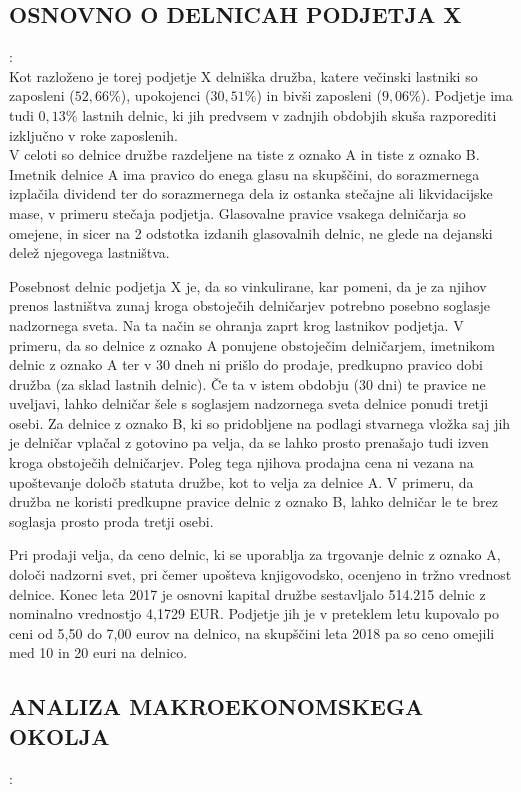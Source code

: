 \documentclass[12pt,a4paper]{amsart}
\theoremstyle{definition} %
\theoremstyle{plain} %
\begin{document}
\subsection{OSNOVNO O DELNICAH PODJETJA X}:\\

Kot razloženo je torej podjetje X delniška družba, katere večinski lastniki so zaposleni ($52,66\%$), upokojenci ($30,51\%$) in bivši zaposleni ($9,06\%$). Podjetje ima tudi $0,13\%$ lastnih delnic, ki jih predvsem v zadnjih obdobjih skuša razporediti izključno v roke zaposlenih.\\
V celoti so delnice družbe razdeljene na tiste z oznako A in tiste z oznako B. Imetnik delnice A ima pravico do enega glasu na skupščini, do sorazmernega izplačila dividend ter do sorazmernega dela iz ostanka stečajne ali likvidacijske mase, v primeru stečaja podjetja. Glasovalne pravice vsakega delničarja so omejene, in sicer na 2 odstotka izdanih glasovalnih delnic, ne glede na dejanski delež njegovega lastništva.\par
Posebnost delnic podjetja X je, da so vinkulirane, kar pomeni, da je za njihov prenos lastništva zunaj kroga obstoječih delničarjev potrebno posebno soglasje nadzornega sveta. Na ta način se ohranja zaprt krog lastnikov podjetja. V primeru, da so delnice z oznako A ponujene obstoječim delničarjem, imetnikom delnic z oznako A ter v 30 dneh ni prišlo do prodaje, predkupno pravico dobi družba (za sklad lastnih delnic). Če ta v istem obdobju (30 dni) te pravice ne uveljavi, lahko delničar šele s soglasjem nadzornega sveta delnice ponudi tretji osebi.
Za delnice z oznako B, ki so pridobljene na podlagi stvarnega vložka saj jih je delničar vplačal z gotovino pa velja, da se lahko prosto prenašajo tudi izven kroga obstoječih delničarjev. Poleg tega njihova prodajna cena ni vezana na upoštevanje določb statuta družbe, kot to velja za delnice A. V primeru, da družba ne koristi predkupne pravice delnic z oznako B, lahko delničar le te brez soglasja prosto proda tretji osebi.\par
Pri prodaji velja, da ceno delnic, ki se uporablja za trgovanje delnic z oznako A, določi nadzorni svet, pri čemer upošteva knjigovodsko, ocenjeno in tržno vrednost delnice. Konec leta 2017 je osnovni kapital družbe sestavljalo 514.215 delnic z nominalno vrednostjo 4,1729 EUR. Podjetje jih je v preteklem letu kupovalo po ceni od 5,50 do 7,00 eurov na delnico, na skupščini leta 2018 pa so ceno omejili med 10 in 20 euri na delnico.


\subsection{ANALIZA MAKROEKONOMSKEGA OKOLJA}:\\
\end{document}
